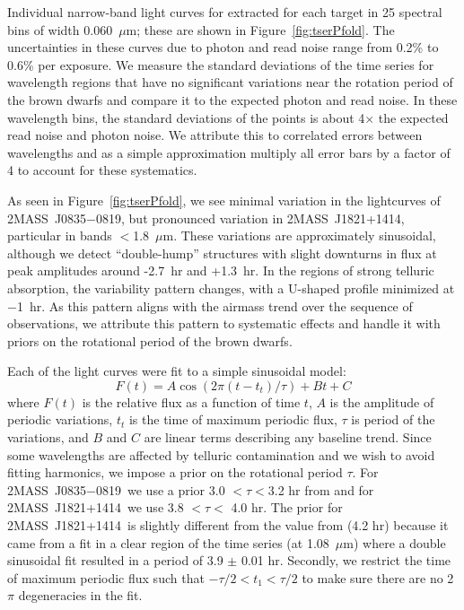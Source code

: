 \documentclass[twocolumn]{aastex6}
\newcommand{\sha}{2MASS~J0835$-$0819}
\newcommand{\shb}{2MASS~J1821+1414}
\begin{document}
Individual narrow-band light curves for extracted for each target in 25 spectral bins of width 0.060~$\mu$m; these are shown in Figure~\ref{fig:tserPfold}.
The uncertainties in these curves due to photon and read noise range from 0.2\% to 0.6\% per exposure.
We measure the standard deviations of the time series for wavelength regions that have no significant variations near the rotation period of the brown dwarfs and compare it to the expected photon and read noise.
In these wavelength bins, the standard deviations of the points is about 4$\times$ the expected read noise and photon noise.
We attribute this to correlated errors between wavelengths and as a simple approximation multiply all error bars by a factor of 4 to account for these systematics.

As seen in Figure~\ref{fig:tserPfold}, we see minimal variation in the lightcurves of {\sha}, but pronounced variation in {\shb}, particular in bands $<$1.8~$\mu$m. 
These variations are approximately sinusoidal, although we detect ``double-hump'' structures with slight downturns in flux at peak amplitudes around -2.7~hr and +1.3~hr.
In the regions of strong telluric absorption, the variability pattern changes, with a U-shaped profile minimized at $-$1~hr.
As this pattern aligns with the airmass trend over the sequence of observations, we attribute this pattern to systematic effects and handle it with priors on the rotational period of the brown dwarfs.

Each of the light curves were fit to a simple sinusoidal model:
\begin{equation}\label{eq:cosfit}
F(t) = A \cos(2 \pi (t - t_t)/\tau) + B t + C
\end{equation}
where $F(t)$ is the relative flux as a function of time $t$, $A$ is the amplitude of periodic variations, $t_t$ is the time of maximum periodic flux, $\tau$ is period of the variations, and $B$ and $C$ are linear terms describing any baseline trend.
Since some wavelengths are affected by telluric contamination and we wish to avoid fitting harmonics, we impose a prior on the rotational period $\tau$.
For \sha\ we use a prior 3.0 $< \tau < $3.2 hr from \citet{2004MNRAS.354..378K} and for \shb\ we use 3.8 $< \tau <$ 4.0 hr.
The prior for \shb\ is slightly different from the value from \citet{2015ApJ...799..154M}(4.2 hr) because it came from a fit in a clear region of the time series (at 1.08~$\mu$m) where a double sinusoidal fit resulted in a period of 3.9 $\pm$ 0.01 hr.
Secondly, we restrict the time of maximum periodic flux such that $-\tau/2 < t_1 < \tau/2$ to make sure there are no 2$\pi$ degeneracies in the fit.
\end{document}
